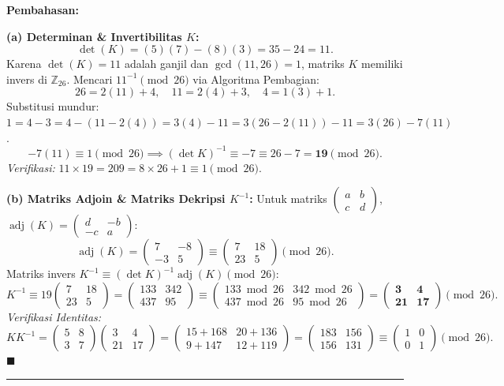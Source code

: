 \documentclass[11pt,a4paper]{article}
\newenvironment{solusi}{\noindent\textbf{\textsf{Pembahasan:}}\par\vspace{0.2em}}{\hfill$\blacksquare$\vspace{1em}\par\hrule\vspace{1em}}
\begin{document}
\begin{solusi}
\textbf{(a) Determinan \& Invertibilitas $K$:}
\[
\det(K) = (5)(7) - (8)(3) = 35 - 24 = 11.
\]
Karena $\det(K) = 11$ adalah ganjil dan $\gcd(11, 26) = 1$, matriks $K$ memiliki invers di $\mathbb{Z}_{26}$.
Mencari $11^{-1} \pmod{26}$ via Algoritma Pembagian:
\[
26 = 2(11) + 4, \quad 11 = 2(4) + 3, \quad 4 = 1(3) + 1.
\]
Substitusi mundur: $1 = 4 - 3 = 4 - (11 - 2(4)) = 3(4) - 11 = 3(26 - 2(11)) - 11 = 3(26) - 7(11)$.
\[
-7(11) \equiv 1 \pmod{26} \implies (\det K)^{-1} \equiv -7 \equiv 26 - 7 = \mathbf{19} \pmod{26}.
\]
\textit{Verifikasi:} $11 \times 19 = 209 = 8 \times 26 + 1 \equiv 1 \pmod{26}$.

\vspace{0.2cm}
\textbf{(b) Matriks Adjoin \& Matriks Dekripsi $K^{-1}$:}
Untuk matriks $\begin{pmatrix} a & b \\ c & d \end{pmatrix}$, $\operatorname{adj}(K) = \begin{pmatrix} d & -b \\ -c & a \end{pmatrix}$:
\[
\operatorname{adj}(K) = \begin{pmatrix} 7 & -8 \\ -3 & 5 \end{pmatrix} \equiv \begin{pmatrix} 7 & 18 \\ 23 & 5 \end{pmatrix} \pmod{26}.
\]
Matriks invers $K^{-1} \equiv (\det K)^{-1} \operatorname{adj}(K) \pmod{26}$:
\[
K^{-1} \equiv 19 \begin{pmatrix} 7 & 18 \\ 23 & 5 \end{pmatrix} = \begin{pmatrix} 133 & 342 \\ 437 & 95 \end{pmatrix} \equiv \begin{pmatrix} 133 \bmod 26 & 342 \bmod 26 \\ 437 \bmod 26 & 95 \bmod 26 \end{pmatrix} = \mathbf{\begin{pmatrix} 3 & 4 \\ 21 & 17 \end{pmatrix}} \pmod{26}.
\]
\textit{Verifikasi Identitas:}
\[
K K^{-1} = \begin{pmatrix} 5 & 8 \\ 3 & 7 \end{pmatrix} \begin{pmatrix} 3 & 4 \\ 21 & 17 \end{pmatrix} = \begin{pmatrix} 15 + 168 & 20 + 136 \\ 9 + 147 & 12 + 119 \end{pmatrix} = \begin{pmatrix} 183 & 156 \\ 156 & 131 \end{pmatrix} \equiv \begin{pmatrix} 1 & 0 \\ 0 & 1 \end{pmatrix} \pmod{26}.
\]
\end{solusi}
\end{document}
